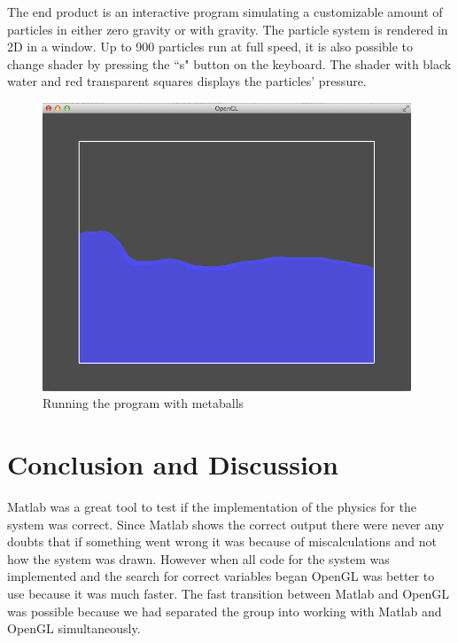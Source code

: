 \documentclass[a4paper,12pt,twoside,final]{report}
\begin{document}
\noindent The end product is an interactive program simulating a customizable amount of particles in either zero gravity or with gravity. The particle system is rendered in 2D in a window. Up to 900 particles run at full speed, it is also possible to change shader by pressing the “s" button on the keyboard. The shader with black water and red transparent squares displays the particles’ pressure. \\

\begin{figure}[H]
\begin{center}
    \includegraphics[width=11cm]{figs/image_1.png} 
\end{center}
\caption{Running the program with metaballs}
\label{model_block}
\end{figure}



\chapter{Conclusion and Discussion}

Matlab was a great tool to test if the implementation of the physics for the system was correct. Since Matlab shows the correct output there were never any doubts that if something went wrong it was because of miscalculations and not how the system was drawn. However when all code for the system was implemented and the search for correct variables began OpenGL was better to use because it was much faster. The fast transition between Matlab and OpenGL was possible because we had separated the group into working with Matlab and OpenGL simultaneously. \\
\end{document}
